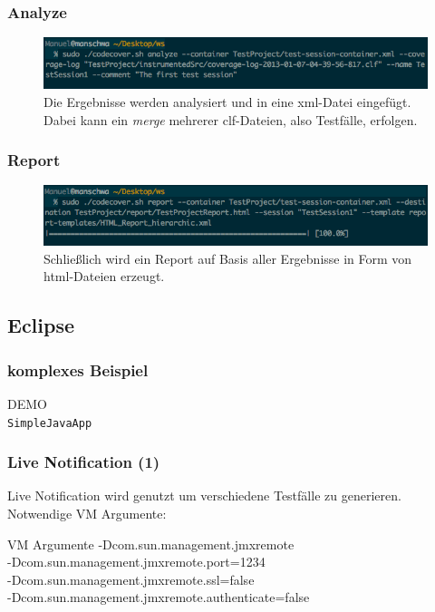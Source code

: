 \documentclass{beamer}
\begin{document}
  \begin{frame}\frametitle{Analyze}
    \begin{figure}%
			\includegraphics[width=\columnwidth]{pictures/demo_commandline/04_analyse.png}%
			\caption{Die Ergebnisse werden analysiert und in eine xml-Datei eingefügt. Dabei kann ein \textit{merge} mehrerer clf-Dateien, also Testfälle, erfolgen.}%
			\label{}%
		\end{figure}
  \end{frame}
  
  \begin{frame}\frametitle{Report}
    \begin{figure}%
			\includegraphics[width=\columnwidth]{pictures/demo_commandline/05_report.png}%
			\caption{Schließlich wird ein Report auf Basis aller Ergebnisse in Form von html-Dateien erzeugt.}%
			\label{}%
		\end{figure}
  \end{frame}

  \subsection{Eclipse}
  \begin{frame}\frametitle{komplexes Beispiel}
    \centering
    \Huge{DEMO}\\
    \centering
    \normalsize{\texttt{SimpleJavaApp}}\\
  \end{frame}

  \begin{frame}\frametitle{Live Notification (1)}
    Live Notification wird genutzt um verschiedene Testfälle zu generieren.\\
    Notwendige VM Argumente:
    \begin{block}{VM Argumente}
      -Dcom.sun.management.jmxremote \\
      -Dcom.sun.management.jmxremote.port=1234 \\
      -Dcom.sun.management.jmxremote.ssl=false \\
      -Dcom.sun.management.jmxremote.authenticate=false
    \end{block}
  \end{frame}
\end{document}
